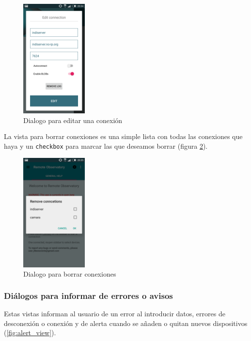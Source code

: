 \begin{figure}[!ht]
  \begin{center}
  \includegraphics[width=0.3\textwidth]{../images/editar_conexion.png}
  \caption{Dialogo para editar una conexión}
  \label{fig:edit_connect}
  \end{center}
\end{figure}

\bigskip
La vista para borrar conexiones es una simple lista con todas las conexiones que haya y un \texttt{checkbox} para marcar las que deseamos borrar (figura \ref{fig:remove_connect}).


\begin{figure}[!ht]
  \begin{center}
  \includegraphics[width=0.3\textwidth]{../images/borrar_conexiones.png}
  \caption{Dialogo para borrar conexiones}
  \label{fig:remove_connect}
  \end{center}
\end{figure}


\bigskip
\subsubsection{Diálogos para informar de errores o avisos}
Estas vistas informan al usuario de un error al introducir datos, errores de desconexión o conexión y de alerta cuando se añaden o quitan nuevos dispositivos (\ref{fig:alert_view}).

